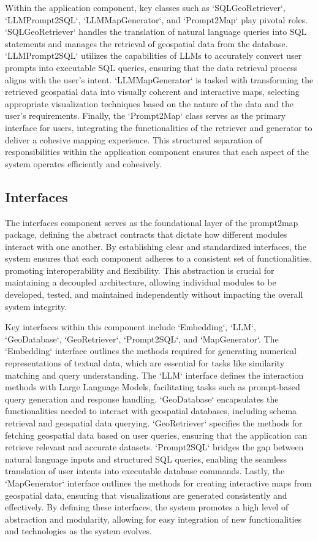 Within the application component, key classes such as `SQLGeoRetriever`, `LLMPrompt2SQL`, `LLMMapGenerator`, and `Prompt2Map` play pivotal roles. `SQLGeoRetriever` handles the translation of natural language queries into SQL statements and manages the retrieval of geospatial data from the database. `LLMPrompt2SQL` utilizes the capabilities of LLMs to accurately convert user prompts into executable SQL queries, ensuring that the data retrieval process aligns with the user's intent. `LLMMapGenerator` is tasked with transforming the retrieved geospatial data into visually coherent and interactive maps, selecting appropriate visualization techniques based on the nature of the data and the user's requirements. Finally, the `Prompt2Map` class serves as the primary interface for users, integrating the functionalities of the retriever and generator to deliver a cohesive mapping experience. This structured separation of responsibilities within the application component ensures that each aspect of the system operates efficiently and cohesively.

\subsection{Interfaces}
The interfaces component serves as the foundational layer of the prompt2map package, defining the abstract contracts that dictate how different modules interact with one another. By establishing clear and standardized interfaces, the system ensures that each component adheres to a consistent set of functionalities, promoting interoperability and flexibility. This abstraction is crucial for maintaining a decoupled architecture, allowing individual modules to be developed, tested, and maintained independently without impacting the overall system integrity.

Key interfaces within this component include `Embedding`, `LLM`, `GeoDatabase`, `GeoRetriever`, `Prompt2SQL`, and `MapGenerator`. The `Embedding` interface outlines the methods required for generating numerical representations of textual data, which are essential for tasks like similarity matching and query understanding. The `LLM` interface defines the interaction methods with Large Language Models, facilitating tasks such as prompt-based query generation and response handling. `GeoDatabase` encapsulates the functionalities needed to interact with geospatial databases, including schema retrieval and geospatial data querying. `GeoRetriever` specifies the methods for fetching geospatial data based on user queries, ensuring that the application can retrieve relevant and accurate datasets. `Prompt2SQL` bridges the gap between natural language inputs and structured SQL queries, enabling the seamless translation of user intents into executable database commands. Lastly, the `MapGenerator` interface outlines the methods for creating interactive maps from geospatial data, ensuring that visualizations are generated consistently and effectively. By defining these interfaces, the system promotes a high level of abstraction and modularity, allowing for easy integration of new functionalities and technologies as the system evolves.

